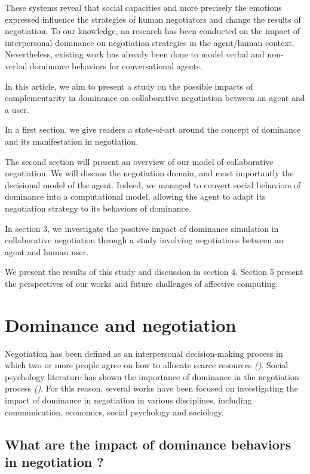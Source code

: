 \documentclass[10pt, a4paper]{article} %
\begin{document}
	 These systems reveal that social capacities and more precisely the emotions expressed influence the strategies of human negotiators and change the results of negotiation. To our knowledge, no research has been conducted on the impact of interpersonal dominance on negotiation strategies in the agent/human context. 	 
	 Nevertheless, existing work has already been done to model verbal and non-verbal dominance behaviors for conversational agents. 
	 
	
	In this article, we aim to present a study on the possible impacts of complementarity in dominance on collaborative negotiation between an agent and a user.
	
	In a first section, we give readers a state-of-art around the concept of dominance and its manifestation in negotiation. 
	
	The second section will present an overview of our model of collaborative negotiation. We will discuss the negotiation domain, and most importantly the decisional model of the agent. Indeed, we managed to convert social behaviors of dominance into a computational model, allowing the agent to adapt its negotiation strategy to its behaviors of dominance.
	
	In section 3, we investigate the positive impact of dominance simulation in collaborative negotiation through a study involving negotiations between an agent and human user.
	
	We present the results of this study and discussion in section 4. Section 5 present the perspectives of our works and future challenges of affective computing. 
\section{Dominance and negotiation}	
	\label{sec:Dom}
	Negotiation has been defined as an interpersonal decision-making process in which two or more people agree on how to allocate scarce resources \emph{(\cite {thompson2000mind})}.  Social psychology literature has shown the importance of dominance in the negotiation process \emph{(\cite{de1995impact,van2006power,fiske1993controlling})}. For this reason, several works have been focused on investigating the impact of dominance in negotiation in various disciplines, including communication, economics, social psychology and sociology.
	
	\subsection{What are the impact of dominance behaviors in negotiation ?}
	
\end{document}
